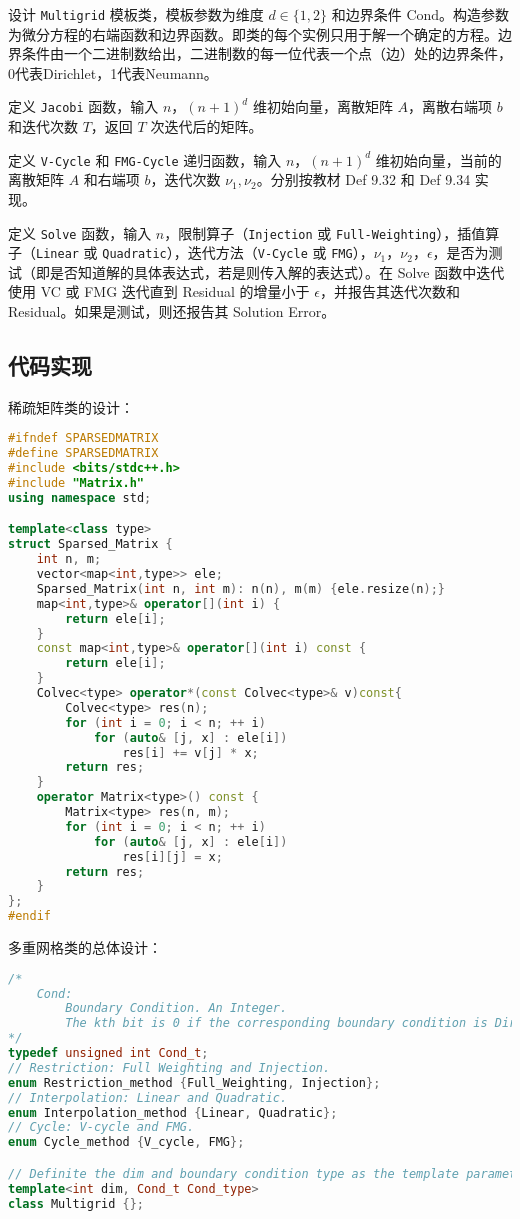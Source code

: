 \documentclass{ctexart}
\begin{document}
设计 \verb|Multigrid| 模板类，模板参数为维度 $d \in \{1,2\}$ 和边界条件 $\text{Cond}$。构造参数为微分方程的右端函数和边界函数。即类的每个实例只用于解一个确定的方程。边界条件由一个二进制数给出，二进制数的每一位代表一个点（边）处的边界条件，0代表Dirichlet，1代表Neumann。

定义 \verb|Jacobi| 函数，输入 $n$，$(n+1)^d$ 维初始向量，离散矩阵 $A$，离散右端项 $b$ 和迭代次数 $T$，返回 $T$ 次迭代后的矩阵。

定义 \verb|V-Cycle| 和 \verb|FMG-Cycle| 递归函数，输入 $n$，$(n+1)^d$ 维初始向量，当前的离散矩阵 $A$ 和右端项 $b$，迭代次数 $\nu_1,\nu_2$。分别按教材 Def 9.32 和 Def 9.34 实现。

定义 \verb|Solve| 函数，输入 $n$，限制算子（\verb|Injection| 或 \verb|Full-Weighting|），插值算子（\verb|Linear| 或 \verb|Quadratic|），迭代方法（\verb|V-Cycle| 或 \verb|FMG|），$\nu_1$，$\nu_2$，$\epsilon$，是否为测试（即是否知道解的具体表达式，若是则传入解的表达式）。在 Solve 函数中迭代使用 VC 或 FMG 迭代直到 Residual 的增量小于 $\epsilon$，并报告其迭代次数和 Residual。如果是测试，则还报告其 Solution Error。

\subsection{代码实现}

稀疏矩阵类的设计：

\begin{lstlisting}[language=c++]
#ifndef SPARSEDMATRIX
#define SPARSEDMATRIX
#include <bits/stdc++.h>
#include "Matrix.h"
using namespace std;

template<class type>
struct Sparsed_Matrix {
	int n, m;
	vector<map<int,type>> ele;
	Sparsed_Matrix(int n, int m): n(n), m(m) {ele.resize(n);}
	map<int,type>& operator[](int i) {
		return ele[i];
	}
	const map<int,type>& operator[](int i) const {
		return ele[i];
	}
	Colvec<type> operator*(const Colvec<type>& v)const{
		Colvec<type> res(n);
		for (int i = 0; i < n; ++ i)
			for (auto& [j, x] : ele[i])
				res[i] += v[j] * x;
		return res;
	}
	operator Matrix<type>() const {
		Matrix<type> res(n, m);
		for (int i = 0; i < n; ++ i)
			for (auto& [j, x] : ele[i])
				res[i][j] = x;
		return res;
	}
};
#endif
\end{lstlisting}

多重网格类的总体设计：
\begin{lstlisting}[language=c++]
/*
	Cond:
		Boundary Condition. An Integer.
		The kth bit is 0 if the corresponding boundary condition is Dirichlet and 1 if that is Neumann.
*/
typedef unsigned int Cond_t;
// Restriction: Full Weighting and Injection.
enum Restriction_method {Full_Weighting, Injection};
// Interpolation: Linear and Quadratic.
enum Interpolation_method {Linear, Quadratic};
// Cycle: V-cycle and FMG.
enum Cycle_method {V_cycle, FMG};

// Definite the dim and boundary condition type as the template parameters.
template<int dim, Cond_t Cond_type>
class Multigrid {};
\end{lstlisting}
\end{document}
